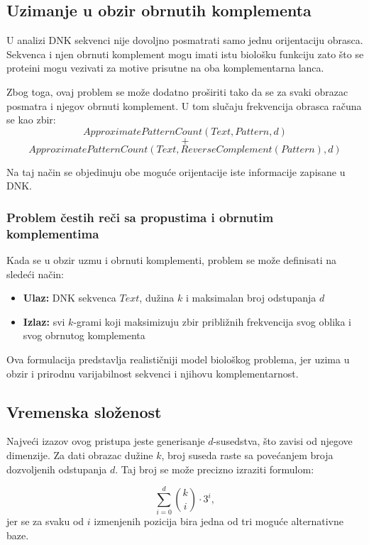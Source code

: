 \documentclass[12pt,oneside]{memoir}
\begin{document}
\subsection{Uzimanje u obzir obrnutih komplementa}

U analizi DNK sekvenci nije dovoljno posmatrati samo jednu orijentaciju obrasca. Sekvenca i njen obrnuti komplement mogu imati istu biološku funkciju zato što se proteini mogu vezivati za motive prisutne na oba komplementarna lanca.

Zbog toga, ovaj problem se može dodatno proširiti tako da se za svaki obrazac posmatra i njegov obrnuti komplement. U tom slučaju frekvencija obrasca računa se kao zbir:
\[
ApproximatePatternCount(Text, Pattern, d)\] 
\[
+ 
\]
\[
ApproximatePatternCount(Text, ReverseComplement(Pattern), d)
\]

Na taj način se objedinuju obe moguće orijentacije iste informacije zapisane u DNK.

\subsubsection{Problem čestih reči sa propustima i obrnutim komplementima}

Kada se u obzir uzmu i obrnuti komplementi, problem se može definisati na sledeći način:

\begin{itemize}
    \item \textbf{Ulaz:} DNK sekvenca $Text$, dužina $k$ i maksimalan broj odstupanja $d$
    \item \textbf{Izlaz:} svi $k$-grami koji maksimizuju zbir približnih frekvencija svog oblika i svog obrnutog komplementa
\end{itemize}

Ova formulacija predstavlja realističniji model biološkog problema, jer uzima u obzir i prirodnu varijabilnost sekvenci i njihovu komplementarnost.


\subsection{Vremenska složenost}

Najveći izazov ovog pristupa jeste generisanje $d$-susedstva, što zavisi od njegove dimenzije. Za dati obrazac dužine $k$, broj suseda raste sa povećanjem broja dozvoljenih odstupanja $d$. Taj broj se može precizno izraziti formulom:

\[
\sum_{i=0}^{d} \binom{k}{i} \cdot 3^i,
\]
jer se za svaku od $i$ izmenjenih pozicija bira jedna od tri moguće alternativne baze.
\end{document}
